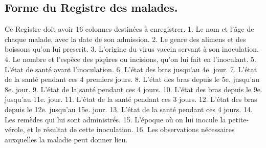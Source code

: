 \subsection{Forme du Registre des malades.}
Ce Registre doit avoir 16 colonnes destinées à enregistrer.
1. Le nom et l'âge de chaque malade, avec la date de son admission.
2. Le genre des alimens et des boissons qu'on lui prescrit.
3. L'origine du virus vaccin servant à son inoculation.
4. Le nombre et l'espèce des piqûres ou incisions, qu'on lui fait en l'inoculant.
5. L'état de santé avant l'inoculation.
6. L'état des bras jusqu'au 4e. jour.
7. L'état de la santé pendant ces 4 premiers jours.
8. L'état des bras depuis le 5e. jusqu'au 8e. jour.
9. L'état de la santé pendant ces 4 jours.
10. L'état des bras depuis le 9e. jusqu'au 11e. jour.
11. L'état de la santé pendant ces 3 jours.
12. L'état des bras depuis le 12e. jusqu'au 15e. jour.
13. L'état de la santé pendant ces 4 jours.
\setcounter{page}{276}
14. Les remèdes qui lui sont administrés.
15. L'époque où on lui inocule la petite-vérole, et le résultat de cette inoculation.
16. Les observations nécessaires auxquelles la maladie peut donner lieu.

